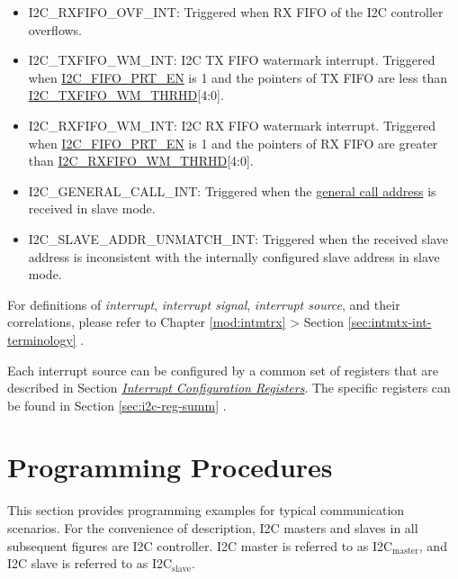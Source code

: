 \documentclass[main\_\_EN.tex]{subfiles}
\begin{document}
\begin{itemize}
\item \label{int:i2c-rxfifo-ovf}I2C\_RXFIFO\_OVF\_INT: Triggered when RX FIFO of the I2C controller overflows.
\item \label{int:i2c-txfifo-wm}I2C\_TXFIFO\_WM\_INT: I2C TX FIFO watermark interrupt. Triggered when \hyperref[fielddesc:I2CFIFOPRTEN]{I2C\_FIFO\_PRT\_EN} is 1 and the pointers of TX FIFO are less than \hyperref[fielddesc:I2CTXFIFOWMTHRHD]{I2C\_TXFIFO\_WM\_THRHD}[4:0].
\item \label{int:i2c-rxfifo-wm}I2C\_RXFIFO\_WM\_INT: I2C RX FIFO watermark interrupt. Triggered when \hyperref[fielddesc:I2CFIFOPRTEN]{I2C\_FIFO\_PRT\_EN} is 1 and the pointers of RX FIFO are greater than \hyperref[fielddesc:I2CRXFIFOWMTHRHD]{I2C\_RXFIFO\_WM\_THRHD}[4:0].
\item \label{int:i2c-general-call}I2C\_GENERAL\_CALL\_INT: Triggered when the \href{https://www.csd.uoc.gr/~hy428/reading/i2c_spec.pdf#page=16}{general call address} is received in slave mode.
\item I2C\_SLAVE\_ADDR\_UNMATCH\_INT: Triggered when the received slave address is inconsistent with the internally configured slave address in slave mode.
\end{itemize}

\begin{tiplisting}
For definitions of \textit{interrupt}, \textit{interrupt signal}, \textit{interrupt source}, and their correlations, please refer to Chapter \ref{mod:intmtrx} \textit{} > Section \ref{sec:intmtx-int-terminology} \textit{}.
\end{tiplisting}

Each interrupt source can be configured by a common set of registers that are described in Section \hyperref[interrupt-config-registers]{\textit{Interrupt Configuration Registers}}. The specific registers can be found in Section \ref{sec:i2c-reg-summ} \textit{}.

\section{Programming Procedures}
\label{subsec:i2c-prom-guide}

This section provides programming examples for typical communication scenarios. For the convenience of description, I2C masters and slaves in all subsequent figures are \chipname{} I2C controller. I2C master is referred to as I2C$_\text{master}$, and I2C slave is referred to as I2C$_\text{slave}$.
\end{document}
